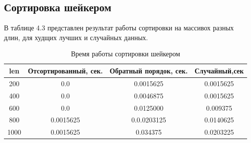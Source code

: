 \documentclass[12pt]{report}
\begin{document}
\subsection{Сортировка шейкером}
В таблице 4.3 представлен результат работы сортировки на массивох разных длин, для худщих лучших и случайных данных.
\begin{table}[h!]
	\begin{tabular}{|c|c|c|c|}
	len & Отсортированный, сек. & Обратный порядок, сек. & Случайный,сек \\ [0.5ex] 
 	\hline\hline
 	200 & 0.0 & 0.0015625 & 0.0015625 \\
 	\hline
 	400 & 0.0 & 0.0046875 & 0.0015625\\
 	\hline
	600 & 0.0 & 0.0125000 &  0.009375\\
	\hline
	800 & 0.0015625 & 0.0.0203125 & 0.0140625\\
	\hline
	1000 & 0.0015625 & 0.034375 & 0.0203225\\
	\hline
	\end{tabular}
	\caption{Время работы сортировки шейкером}
\end{table}
\end{document}
